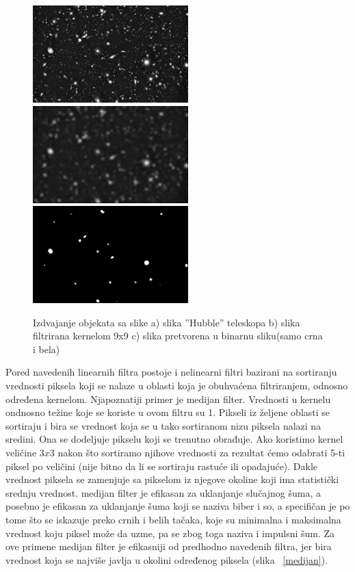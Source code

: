 \documentclass[a4paper,12pt,titlepage]{article}
\begin{document}
\begin{figure}[ht!]
\centering
\includegraphics[width=60mm]{img/tel.jpg}
\includegraphics[width=60mm]{img/telAvg.jpg}
\includegraphics[width=60mm]{img/telTh.jpg}
\caption{Izdvajanje objekata sa slike a) slika ''Hubble'' teleskopa b) slika filtrirana kernelom 9x9 c) slika pretvorena u binarnu sliku(samo crna i bela)}
\label{zvezde}
\end{figure}

Pored navedenih linearnih filtra postoje i nelinearni filtri bazirani na sortiranju vrednosti piksela koji se nalaze u oblasti koja je obuhvaćena filtriranjem, odnosno određena kernelom. Njapoznatiji primer je medijan filter. Vrednosti u kernelu ondnosno težine koje se koriste u ovom filtru su 1. Pikseli iz željene oblasti se sortiraju i bira se vrednost koja se u tako sortiranom nizu piksela nalazi na sredini. Ona se dodeljuje pikselu koji se trenutno obrađuje. Ako koristimo kernel veličine $3 x 3$ nakon što sortiramo njihove vrednosti za rezultat ćemo odabrati 5-ti piksel po veličini (nije bitno da li se sortiraju rastuće ili opadajuće). Dakle vrednost piksela se zamenjuje sa pikselom iz njegove okoline koji ima statistički srednju vrednost. medijan filter je efikasan za uklanjanje slučajnog šuma, a posebno je efikasan za uklanjanje šuma koji se naziva biber i so, a specifičan je po tome što se iskazuje preko crnih i belih tačaka, koje su minimalna i maksimalna vrednost koju piksel može da uzme, pa se zbog toga naziva i impulsni šum. Za ove primene medijan filter je efikasniji od predhodno navedenih filtra, jer bira vrednost koja se najviše javlja u okolini određenog piksela (slika ~\ref{medijan}).
\end{document}
